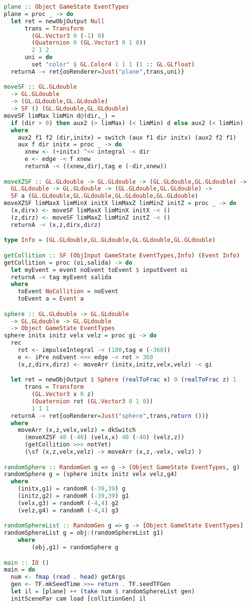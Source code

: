 \begin{lstlisting}[label={Ejemplo2},caption={Ejemplo - Objetos que chocan},language=Haskell]
plane :: Object GameState EventTypes
plane = proc _ -> do
  let ret = newObjOutput Null
      trans = Transform
        (GL.Vector3 0 (-1) 0)
        (Quaternion 0 (GL.Vector3 0 1 0))
        2 1 2
      uni = do
        set "color" $ GL.Color4 1 1 1 (1 :: GL.GLfloat)
  returnA -< ret{ooRenderer=Just("plane",trans,uni)}

moveSF :: GL.GLdouble
  -> GL.GLdouble
  -> (GL.GLdouble,GL.GLdouble)
  -> SF () (GL.GLdouble,GL.GLdouble)
moveSF limMax limMin d@(dir,_) =
  if (dir > 0) then aux2 (> limMax) (< limMin) d else aux2 (< limMin) (> limMax) d
  where
    aux2 f1 f2 (dir,initx) = switch (aux f1 dir initx) (aux2 f2 f1)
    aux f dir initx = proc _ -> do
      xnew <- (+initx) ^<< integral -< dir
      e <- edge -< f xnew
      returnA -< ((xnew,dir),tag e (-dir,xnew))

moveXZSF :: GL.GLdouble -> GL.GLdouble -> (GL.GLdouble,GL.GLdouble) ->
  GL.GLdouble -> GL.GLdouble -> (GL.GLdouble,GL.GLdouble) ->
  SF a (GL.GLdouble,GL.GLdouble,GL.GLdouble,GL.GLdouble)
moveXZSF limMaxX limMinX initX limMaxZ limMinZ initZ = proc _ -> do
  (x,dirx) <- moveSF limMaxX limMinX initX -< ()
  (z,dirz) <- moveSF limMaxZ limMinZ initZ -< ()
  returnA -< (x,z,dirx,dirz)

type Info = (GL.GLdouble,GL.GLdouble,GL.GLdouble,GL.GLdouble)

getCollition :: SF (ObjInput GameState EventTypes,Info) (Event Info)
getCollition = proc (oi,salida) -> do
  let myEvent = event noEvent toEvent $ inputEvent oi
  returnA -< tag myEvent salida
  where
    toEvent NoCollition = noEvent
    toEvent a = Event a

sphere :: GL.GLdouble -> GL.GLdouble
  -> GL.GLdouble -> GL.GLdouble
  -> Object GameState EventTypes
sphere initx initz velx velz = proc gi -> do
  rec
    rot <- impulseIntegral -< (180,tag e (-360))
    e <- iPre noEvent <<< edge -< rot > 360
    (x,z,dirx,dirz) <- moveArr (initx,initz,velx,velz) -< gi

  let ret = newObjOutput $ Sphere (realToFrac x) 0 (realToFrac z) 1
      trans = Transform
        (GL.Vector3 x 0 z)
        (Quaternion rot (GL.Vector3 0 1 0))
        1 1 1
  returnA -< ret{ooRenderer=Just("sphere",trans,return ())}
  where
    moveArr (x,z,velx,velz) = dkSwitch
      (moveXZSF 40 (-40) (velx,x) 40 (-40) (velz,z))
      (getCollition >>> notYet)
      (\sf (x,z,velx,velz) -> moveArr (x,z,-velx,-velz) )

randomSphere :: RandomGen g => g -> (Object GameState EventTypes, g)
randomSphere g = (sphere initx initz velx velz,g4)
  where
    (initx,g1) = randomR (-39,39) g
    (initz,g2) = randomR (-39,39) g1
    (velx,g3) = randomR (-4,4) g2
    (velz,g4) = randomR (-4,4) g3

randomSphereList :: RandomGen g => g -> [Object GameState EventTypes]
randomSphereList g = obj:(randomSphereList g1)
	where
		(obj,g1) = randomSphere g

main :: IO ()
main = do
  num <- fmap (read . head) getArgs
  gen <- TF.mkSeedTime >>= return . TF.seedTFGen
  let il = [plane] ++ (take num $ randomSphereList gen)
  initScenePar cam load [collitionGen] il
\end{lstlisting}
